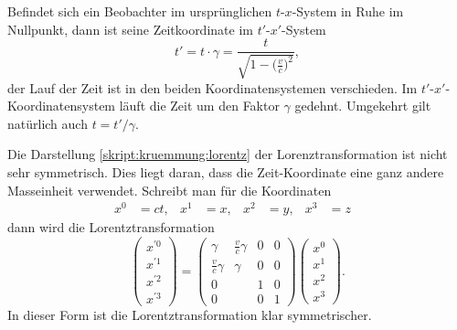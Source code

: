 Befindet sich ein Beobachter im ursprünglichen $t$-$x$-System in Ruhe
im Nullpunkt, dann ist seine Zeitkoordinate im $t'$-$x'$-System
\begin{equation}
t'=t\cdot\gamma = \frac{t}{\displaystyle\sqrt{1-\biggl(\frac{v}{c}\biggr)^2}},
\label{skript:speziell:zeitdilatation}
\end{equation}
der Lauf der Zeit ist in den beiden Koordinatensystemen verschieden.
Im $t'$-$x'$-Koordinatensystem läuft die Zeit um den Faktor $\gamma$
gedehnt.
Umgekehrt gilt natürlich auch $t=t'/\gamma$.


Die Darstellung \eqref{skript:kruemmung:lorentz} der Lorenztransformation
ist nicht sehr symmetrisch.
Dies liegt daran, dass die Zeit-Koordinate eine ganz andere Masseinheit
verwendet.
Schreibt man für die Koordinaten 
\[
\begin{aligned}
x^0&=ct,&
x^1&=x,&
x^2&=y,&
x^3&=z&
\end{aligned}
\]
dann wird die Lorentztransformation
\begin{equation}
\begin{pmatrix}
x^{\prime0}\\
x^{\prime1}\\
x^{\prime2}\\
x^{\prime3}
\end{pmatrix}
=
\begin{pmatrix}
\displaystyle          \gamma &\displaystyle\frac{v}{c}\gamma& 0 & 0 \\
\displaystyle\frac{v}{c}\gamma&\displaystyle           \gamma& 0 & 0 \\
      0                       &                              & 1 & 0 \\
      0                       &                              & 0 & 1 
\end{pmatrix}
\begin{pmatrix}
x^0\\x^1\\x^2\\x^3
\end{pmatrix}.
\label{skript:speziell:4lorentz}
\end{equation}
In dieser Form ist die Lorentztransformation klar symmetrischer.

